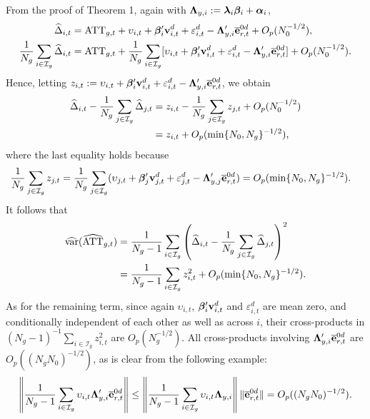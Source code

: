 \documentclass[12pt,fleqn]{article}
\begin{document}
\noindent From the proof of Theorem 1, again with $\boldsymbol{\Lambda}_{y,i} :=  \boldsymbol{\lambda}_i\boldsymbol{\beta}_i + \boldsymbol{\alpha}_i$,
\begin{align}
\widehat \Delta_{i,t} & = \mathrm{ATT}_{g,t} + \upsilon_{i,t}  + \boldsymbol{\beta}_i'\mathbf{v}_{i,t}^d + \varepsilon_{i,t}^d - \boldsymbol{\Lambda}_{y,i}'\overline{\mathbf{e}}_{r,t}^{0d} + O_p(N_0^{-1/2}), \\
\frac{1}{N_g}\sum_{i\in \mathcal{I}_g} \widehat \Delta_{i,t} & = \mathrm{ATT}_{g,t}+ \frac{1}{N_g}\sum_{i\in \mathcal{I}_g} [\upsilon_{i,t}  + \boldsymbol{\beta}_i'\mathbf{v}_{i,t}^d + \varepsilon_{i,t}^d- \boldsymbol{\Lambda}_{y,i}'\overline{\mathbf{e}}_{r,t}^{0d}] + O_p(N_0^{-1/2}).
\end{align}
Hence, letting $z_{i,t} := \upsilon_{i,t}  + \boldsymbol{\beta}_i'\mathbf{v}_{i,t}^d + \varepsilon_{i,t}^d- \boldsymbol{\Lambda}_{y,i}'\overline{\mathbf{e}}_{r,t}^{0d}$, we obtain
\begin{align}
\widehat \Delta_{i,t}  - \frac{1}{N_g}\sum_{j \in \mathcal{I}_g} \widehat \Delta_{j,t} & = z_{i,t}  - \frac{1}{N_g}\sum_{j\in \mathcal{I}_g} z_{j,t} + O_p(N_0^{-1/2}) \notag\\
& = z_{i,t}  + O_p(\min\{N_0,N_g\}^{-1/2}),
\end{align}
where the last equality holds because
\begin{align}
\frac{1}{N_g}\sum_{j\in \mathcal{I}_g} z_{j,t} & = \frac{1}{N_g} \sum_{j \in \mathcal{I}_g} (\upsilon_{j,t}  + \boldsymbol{\beta}_j'\mathbf{v}_{j,t}^d + \varepsilon_{j,t}^d- \boldsymbol{\Lambda}_{y,j}'\overline{\mathbf{e}}_{r,t}^{0d}) =  O_p(\min\{N_0,N_g\}^{-1/2}).
\end{align}
It follows that
\begin{align}
\widehat{\mathrm{var}}(\widehat{\mathrm{ATT}}_{g,t})& = \frac{1}{N_g-1}\sum_{i\in \mathcal{I}_g}\left(\widehat \Delta_{i,t}  - \frac{1}{N_g}\sum_{j\in \mathcal{I}_g} \widehat \Delta_{j,t}\right)^2 \notag\\
& = \frac{1}{N_g-1} \sum_{i\in \mathcal{I}_g} z_{i,t}^2 + O_p(\min\{N_0,N_g\}^{-1/2}) .
\end{align}
As for the remaining term, since again $\upsilon_{i,t}$, $\boldsymbol{\beta}_i'\mathbf{v}_{i,t}^d$ and $\varepsilon_{i,t}^d$ are mean zero, and conditionally independent of each other as well as across $i$, their cross-products in $(N_g-1)^{-1} \sum_{i\in \mathcal{I}_g} z_{i,t}^2$ are $O_p(N_g^{-1/2})$. All cross-products involving $\boldsymbol{\Lambda}_{y,i}'\overline{\mathbf{e}}_{r,t}^{0d}$ are $O_p((N_gN_0)^{-1/2})$, as is clear from the following example:
\begin{align}
\left\|\frac{1}{N_g-1} \sum_{i \in \mathcal{I}_g} \upsilon_{i,t} \boldsymbol{\Lambda}_{y,i}'\overline{\mathbf{e}}_{r,t}^{0d}\right\|  \leq \left\|\frac{1}{N_g-1} \sum_{i \in \mathcal{I}_g} \upsilon_{i,t} \boldsymbol{\Lambda}_{y,i}\right\| \|\overline{\mathbf{e}}_{r,t}^{0d}\|= O_p((N_gN_0)^{-1/2}).
\end{align}
\end{document}
